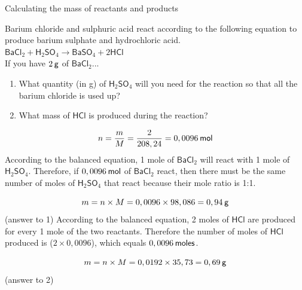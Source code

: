 \label{m38717*secfhsst!!!underscore!!!id695}\vspace{-2cm} 
      \begin{wex}{ Calculating the mass of reactants and products }
{
      \label{m38717*id279063}Barium chloride and sulphuric acid react according to the following equation to produce barium sulphate and hydrochloric acid.\\
      \label{m38717*id279070}
        ${\mathsf{BaCl}}_{2}+{\mathsf{H}}_{2}{\mathsf{SO}}_{4}\to {\mathsf{BaSO}}_{4}+2\mathsf{HCl}$
      \\
      \label{m38717*id279141}If you have $2\phantom{\rule{2pt}{0ex}}\mathsf{g}$ of $\mathsf{BaCl}{}_{2}$... 
      \label{m38717*id279158}\begin{enumerate}[noitemsep, label=\textbf{\arabic*}. ] 
            \label{m38717*uid37}\item What quantity (in g) of $\mathsf{H}{}_{2}\mathsf{SO}{}_{4}$ will you need for the reaction so that all the barium chloride is used up?
\label{m38717*uid38}\item What mass of $\mathsf{HCl}$ is produced during the reaction?
\end{enumerate}
      \vspace{5pt}
}
{
        
    \begin{equation*}
    n=\frac{m}{M}=\frac{2}{208,24}=0,0096\phantom{\rule{2pt}{0ex}}\mathsf{mol}
      \end{equation*}
      \label{m38717*id279344}According to the balanced equation, 1 mole of $\mathsf{BaCl}{}_{2}$ will react with 1 mole of $\mathsf{H}{}_{2}\mathsf{SO}{}_{4}$. Therefore, if $0,0096\phantom{\rule{2pt}{0ex}}\mathsf{mol}$ of $\mathsf{BaCl}{}_{2}$ react, then there must be the same number of moles of $\mathsf{H}{}_{2}\mathsf{SO}{}_{4}$ that react because their mole ratio is 1:1.
      \label{m38717*id279456}\nopagebreak\noindent{}
        
    \begin{equation*}
    m=n\ensuremath{\times}M=0,0096\ensuremath{\times}98,086=0,94\phantom{\rule{2pt}{0ex}}\mathsf{g}
      \end{equation*}
      \label{m38717*id279505}(answer to 1) 
      \label{m38717*id279513}According to the balanced equation, 2 moles of $\mathsf{HCl}$ are produced for every 1 mole of the two reactants. Therefore the number of moles of $\mathsf{HCl}$ produced is ($2\ensuremath{\times}0,0096$), which equals $0,0096\phantom{\rule{2pt}{0ex}}\mathsf{moles}$.
      \label{m38717*id279531}\nopagebreak\noindent{}
        
    \begin{equation*}
    m=n\ensuremath{\times}M=0,0192\ensuremath{\times}35,73=0,69\phantom{\rule{2pt}{0ex}}\mathsf{g}
      \end{equation*}
      \label{m38717*id279580}(answer to 2) 
}
    \end{wex}
